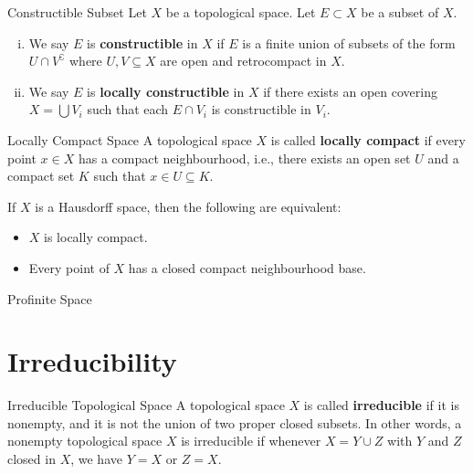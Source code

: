 \documentclass{report}
\begin{document}
\begin{definition}{Constructible Subset}{}
	Let $X$ be a topological space. Let $E \subset X$ be a subset of $X$.
	\begin{enumerate}[(i)]
		\item We say $E$ is \textbf{constructible} in $X$ if $E$ is a finite union of subsets of the form $U \cap V^{\complement}$ where $U, V \subseteq X$ are open and retrocompact in $X$.
		\item We say $E$ is \textbf{locally constructible} in $X$ if there exists an open covering $X=\bigcup V_i$ such that each $E \cap V_i$ is constructible in $V_i$.
	\end{enumerate}
\end{definition}



\begin{definition}{Locally Compact Space}{}
	A topological space $X$ is called \textbf{locally compact} if every point $x\in X$ has a compact neighbourhood, i.e., there exists an open set $U$ and a compact set $K$ such that $x \in U \subseteq K$.
\end{definition}

\begin{proposition}{}{}
	If $X$ is a Hausdorff space, then the following are equivalent:
	\begin{itemize}
		\item $X$ is locally compact.
		\item Every point of $X$ has a closed compact neighbourhood base.
	\end{itemize}
\end{proposition}

\begin{definition}{Profinite Space}{}

\end{definition}

\section{Irreducibility}
\begin{definition}{Irreducible Topological Space}{}
	A topological space $X$ is called \textbf{irreducible} if it is nonempty, and it is not the union of two proper closed subsets. In other words, a nonempty topological space $X$ is irreducible if whenever $X=Y \cup Z$ with $Y$ and $Z$ closed in $X$, we have $Y=X$ or $Z=X$.
\end{definition}
\end{document}
